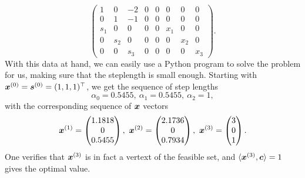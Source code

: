 \begin{example}
\begin{equation*}
\begin{pmatrix}
                                1 & 0 & -2 & 0 & 0 & 0 & 0 & 0 \\
                                0 & 1 & -1 & 0 & 0 & 0 & 0 & 0 \\
                                s_1 & 0 & 0 & 0 & 0 & x_1 & 0 & 0 \\
                                0 & s_2 & 0 & 0 & 0 & 0 & x_2 & 0\\
                                0 & 0 & s_3 & 0 & 0 & 0 & 0 & x_3
                               \end{pmatrix}.
\end{equation*}
With this data at hand, we can easily use a Python program to solve the problem for us, making sure that the steplength is small enough. Starting with $\bm{x}^{(0)}=\bm{s}^{(0)}=(1,1,1)^\top$, we get the sequence of step lengths
\begin{equation*}
 \alpha_0 = 0.5455, \ \alpha_1=0.5455, \ \alpha_2 = 1,
\end{equation*}
with the corresponding sequence of $\bm{x}$ vectors
\begin{equation*}
 \vct{x}^{(1)} = \begin{pmatrix}
                  1.1818\\ 0\\ 0.5455
                 \end{pmatrix}, \ 
 \vct{x}^{(2)} = \begin{pmatrix}
                  2.1736\\ 0 \\ 0.7934
                 \end{pmatrix}, \
 \vct{x}^{(3)} = \begin{pmatrix}
                  3 \\ 0 \\ 1
                 \end{pmatrix}.
\end{equation*}
One verifies that $\bm{x}^{(3)}$ is in fact a vertext of the feasible set, and $\langle {\bm{x}^{(3)}}, {\bm{c}} \rangle=1$ gives the optimal value. 
 \end{example}

